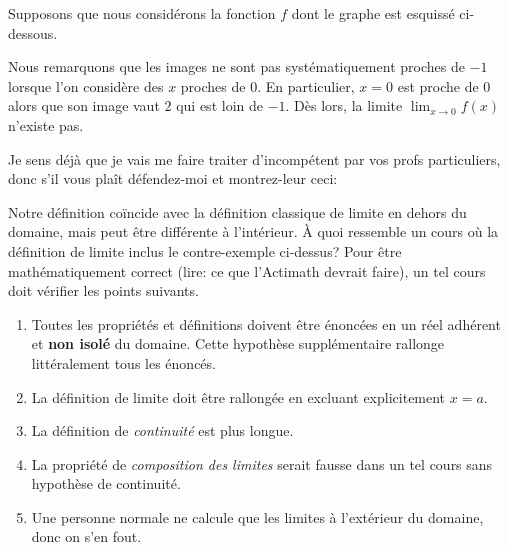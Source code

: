\documentclass[main.tex]{subfiles}
\begin{document}
\begin{example}

    Supposons que nous considérons la fonction $f$ dont le graphe est esquissé ci-dessous.

    \begin{center}
        \begin{plot}{0.5}{-6}{-6}{6}{6}
        \end{plot}
    \end{center}

    Nous remarquons que les images ne sont pas systématiquement proches de $-1$
    lorsque l'on considère des $x$ proches de $0$.
    En particulier, $x = 0$ est proche de $0$
    alors que son image vaut $2$ qui est loin de $-1$.
    Dès lors,
    la limite $\lim_{x \to 0} f(x)$ n'existe pas.
\end{example}

Je sens déjà que je vais me faire traiter d'incompétent par vos profs particuliers,
donc s'il vous plaît défendez-moi et montrez-leur ceci:

\begin{remark}

    Notre définition coïncide avec la définition classique de limite en dehors du domaine,
    mais peut être différente à l'intérieur.
    À quoi ressemble un cours où la définition de limite inclus le contre-exemple ci-dessus?
    Pour être mathématiquement correct
    (lire: ce que l'Actimath devrait faire),
    un tel cours doit vérifier les points suivants.
    \begin{enumerate}
        \item Toutes les propriétés et définitions doivent être énoncées
            en un réel adhérent et \textbf{non isolé} du domaine.
            Cette hypothèse supplémentaire rallonge littéralement tous les énoncés.
        \item La définition de limite doit être rallongée en excluant explicitement $x = a$.
        \item La définition de \emph{continuité} est plus longue.
        \item La propriété de \emph{composition des limites} serait fausse dans un tel cours sans hypothèse de continuité.
        \item Une personne normale ne calcule que les limites à l'extérieur du domaine, donc on s'en fout.
    \end{enumerate}
\end{remark}
\end{document}
